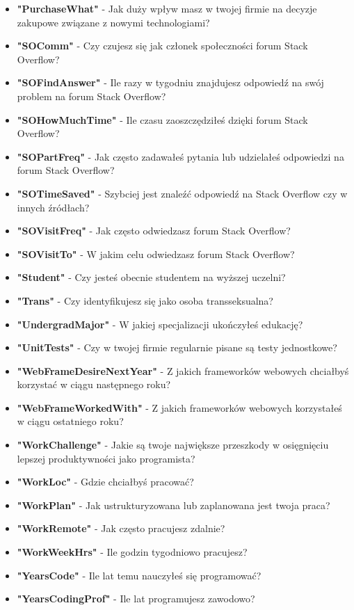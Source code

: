 \begin{appendices}
\begin{itemize}
        \item \textbf{"PurchaseWhat"} - Jak duży wpływ masz w twojej firmie na decyzje zakupowe związane z nowymi technologiami?
        \item \textbf{"SOComm"} - Czy czujesz się jak członek społeczności forum Stack Overflow?
        \item \textbf{"SOFindAnswer"} - Ile razy w tygodniu znajdujesz odpowiedź na swój problem na forum Stack Overflow?
        \item \textbf{"SOHowMuchTime"} - Ile czasu zaoszczędziłeś dzięki forum Stack Overflow?
        \item \textbf{"SOPartFreq"} - Jak często zadawałeś pytania lub udzielałeś odpowiedzi na forum Stack Overflow?
        \item \textbf{"SOTimeSaved"} - Szybciej jest znaleźć odpowiedź na Stack Overflow czy w innych źródłach?
        \item \textbf{"SOVisitFreq"} - Jak często odwiedzasz forum Stack Overflow?
        \item \textbf{"SOVisitTo"} - W jakim celu odwiedzasz forum Stack Overflow?
        \item \textbf{"Student"} - Czy jesteś obecnie studentem na wyższej uczelni?
        \item \textbf{"Trans"} - Czy identyfikujesz się jako osoba transseksualna?
        \item \textbf{"UndergradMajor"} - W jakiej specjalizacji ukończyłeś edukację?
        \item \textbf{"UnitTests"} - Czy w twojej firmie regularnie pisane są testy jednostkowe?
        \item \textbf{"WebFrameDesireNextYear"} - Z jakich frameworków webowych chciałbyś korzystać w ciągu następnego roku?
        \item \textbf{"WebFrameWorkedWith"} - Z jakich frameworków webowych korzystałeś w ciągu ostatniego roku?
        \item \textbf{"WorkChallenge"} - Jakie są twoje największe przeszkody w osięgnięciu lepszej produktywności jako programista?
        \item \textbf{"WorkLoc"} - Gdzie chciałbyś pracować?
        \item \textbf{"WorkPlan"} - Jak ustrukturyzowana lub zaplanowana jest twoja praca?
        \item \textbf{"WorkRemote"} - Jak często pracujesz zdalnie?
        \item \textbf{"WorkWeekHrs"} - Ile godzin tygodniowo pracujesz?
        \item \textbf{"YearsCode"} - Ile lat temu nauczyłeś się programować?
        \item \textbf{"YearsCodingProf"} - Ile lat programujesz zawodowo?
    \end{itemize}
\end{appendices}
\thispagestyle{normal}
